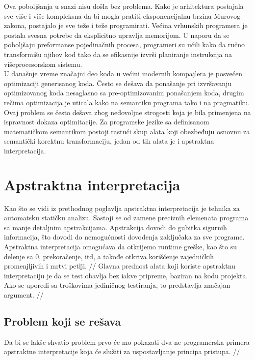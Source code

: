 \documentclass[a4paper]{article}
\begin{document}
{Ova poboljšanja u snazi nisu došla bez problema. Kako je arhitektura postajala sve više i više kompleksna da bi mogla pratiti eksponencijalnu brzinu Murovog zakona, postajalo je sve teže i teže programirati. Većina vrhunskih programera je postala svesna potrebe da eksplicitno upravlja memorijom. U naporu da se poboljšaju preformanse pojedinačnih procesa, programeri su učili kako da ručno transformišu njihov kod tako da se efikasnije izvrši planiranje instrukcija na višeprocesorskom sistemu. \cite{allen2001optimizing} \\

U današnje vreme značajni deo koda u većini modernih kompajlera je posvećen optimizaciji generisanog koda. Često se dešava da ponašanje pri izvršavanju optimizovanog koda nesaglasno sa pre-optimizovanim ponašanjem koda, drugim rečima optimizacija je uticala kako na semantiku programa tako i na pragmatiku. Ovaj problem se često dešava zbog nedovoljne strogosti koja je bila primenjena na ispravnost dokaza optimitacije. Za programske jezike sa definisanom matematičkom semantikom postoji rastući skup alata koji obezbeđuju osnovnu za semantički korektnu transformaciju, jedan od tih alata je i apstraktna interpretacija. \cite{AbramskyHankin} \\


\section{Apstraktna interpretacija}
\label{sec:Apstraktna interpretacija}
Kao što se vidi iz prethodnog poglavlja apstraktna interpretacija je tehnika za automatsku statičku analizu. Sastoji se od zamene preciznih elemenata programa sa manje detaljnim apstrakcijama. Apstrakcija dovodi do gubitka sigurnih informacija, što dovodi do nemogućnosti dovođenja zaključaka za sve programe. Apstraktna interpretacija omogućava da otkrijemo runtime greške, kao što su delenje sa 0, prekoračenje, itd, a takođe otkriva korišćenje zajedničkih promenjljivih i mrtvi petlji. \cite{AbramskyHankin}// 
Glavna prednost alata koji koriste apstraktnu interpretaciju je da se test obavlja bez iakve pripreme, baziran na kodu projekta. Ako se uporedi sa troškovima jediničnog testiranja, to predstavlja značajan argument. \cite{AbramskyHankin} //


\subsection{Problem koji se rešava}
\label{subsec:problem1}
Da bi se lakše shvatio problem prvo će mo pokazati dva ne programerska primera apstraktne interpretacije koja će služiti za uspostavljanje principa pristupa. //

}
\end{document}
